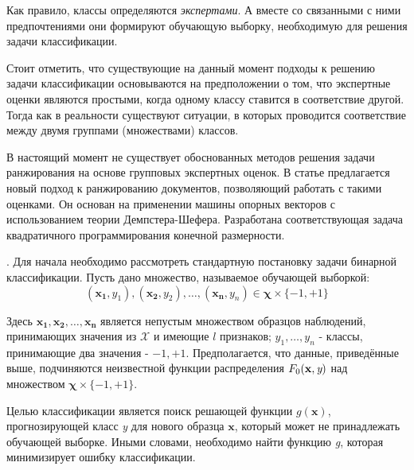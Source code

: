 \documentclass[10pt,a5paper,oneside]{article}
\begin{document}
\par
Как правило, классы определяются \emph{экспертами}.
А вместе со связанными с ними предпочтениями они формируют обучающую выборку, необходимую для решения задачи классификации. 

\par
Стоит отметить, что существующие на данный момент подходы к решению задачи классификации основываются на предположении о том, что экспертные оценки являются простыми, когда одному классу ставится в соответствие другой. 
Тогда как в реальности существуют ситуации, в которых проводится соответствие между двумя группами (множествами) классов. 

\par
В настоящий момент не существует обоснованных методов решения задачи ранжирования на основе групповых экспертных оценок. 
В статье предлагается новый подход к ранжированию документов, позволяющий работать с такими оценками. 
Он основан на применении машины опорных векторов с использованием теории Демпстера-Шефера. 
Разработана соответствующая задача квадратичного программирования конечной размерности. 


\vspace*{1em}

\par
{}. 
Для начала необходимо рассмотреть стандартную постановку задачи бинарной классификации.
Пусть дано множество, называемое обучающей выборкой:
\mbox{}
\[
(\mathbf{x_1}, y_1),(\mathbf{x_2}, y_2), \dots, (\mathbf{x_n}, y_n) \in \mathbf{\chi} \times \{-1,+1\}
\]

\par
Здесь \(\mathbf{x_1}, \mathbf{x_2}, \dots, \mathbf{x_n}\) является непустым множеством образцов наблюдений, принимающих значения из \(\mathcal{X}\) и имеющие $l$ признаков; \(y_1, \dots, y_n\) - классы, принимающие два значения - \(-1,+1\). 
Предполагается, что данные, приведённые выше, подчиняются неизвестной функции распределения \(F_0(\mathbf{x}, \emph{y})\) над множеством \(\mathbf{\chi} \times \{-1, +1\}\). 

\par
Целью классификации является поиск решающей функции \(g(\mathbf{x})\), прогнозирующей класс \emph{y} для нового образца \(\mathbf{x}\), который может не принадлежать обучающей выборке. 
Иными словами, необходимо найти функцию \emph{g}, которая минимизирует ошибку классификации. 
\end{document}
